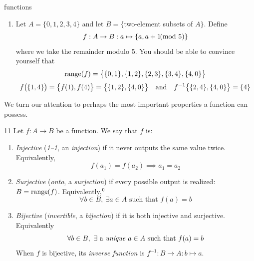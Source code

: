 \begin{examples}{}{functions}
\begin{enumerate}
  \item Let $A=\{0,1,2,3,4\}$ and let $B=\{$two-element subsets of $A\}$. Define
  \[
  	f:A\to B:a\mapsto \{a,a+1\negthickspace \negthickspace\pmod{5}\}
  \]
  where we take the remainder modulo 5. You should be able to convince yourself that
  \begin{gather*}
  	\operatorname{range}(f)=\big\{ \{0,1\}, \{1,2\}, \{2,3\}, \{3,4\}, \{4,0\} \big\}\\[3pt]
  	f\bigl(\{1,4\}\bigr)=\big\{f(1),f(4)\big\}=\big\{\{1,2\},\{4,0\}\big\} \quad\text{and}\quad f^{-1}\bigl\{\{2,4\},\{4,0\}\bigr\}=\{4\}
  \end{gather*}
	\end{enumerate}
  
\end{examples}



We turn our attention to perhaps the most important properties a function can possess.

\begin{defn}{}{11}
	Let $f:A\to B$ be a function. We say that $f$ is:
	\begin{enumerate}
	  \item \emph{Injective} (\emph{1--1}, an \emph{injection}) if it never outputs the same value twice. Equivalently,\footnotemark{}
		\[
			f(a_1)=f(a_2)\implies a_1=a_2 \tag{``$\forall a_1,a_2\in A$'' is typically hidden}
		\]
		\item \emph{Surjective} (\emph{onto}, a \emph{surjection}) if every possible output is realized: $B=\operatorname{range}(f)$. Equivalently,${}^{\thefootnote}$
		\[
			\forall b\in B,\ \exists a\in A\text{ such that }f(a)=b
		\]
		\item \emph{Bijective} (\emph{invertible}, a \emph{bijection}) if it is both injective and surjective. Equivalently
		\[
			\forall b\in B,\ \exists \text{ a \emph{unique} }a\in A\text{ such that }f(a)=b
		\]
		When $f$ is bijective, its \emph{inverse function} is $f^{-1}:B\to A:b\mapsto a$.
	\end{enumerate}
\end{defn}



